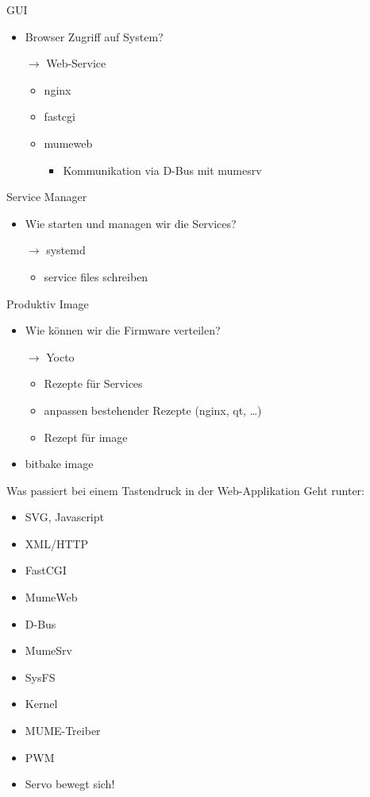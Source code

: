 \begin{frame}{GUI}
	\begin{itemize}
		\item Browser Zugriff auf System?
		\item[$\rightarrow$] Web-Service
		\begin{itemize}
			\item nginx
			\item fastcgi
			\item mumeweb
			\begin{itemize}
				\item Kommunikation via D-Bus mit mumesrv
			\end{itemize}
		\end{itemize}
	\end{itemize}
\end{frame}

\begin{frame}{Service Manager}
	\begin{itemize}
		\item Wie starten und managen wir die Services?
		\item[$\rightarrow$] systemd
		\begin{itemize}
			\item service files schreiben
		\end{itemize}
	\end{itemize}
\end{frame}

\begin{frame}{Produktiv Image}
	\begin{itemize}
		\item Wie können wir die Firmware verteilen?
		\item[$\rightarrow$] Yocto
		\begin{itemize}
			\item Rezepte für Services
			\item anpassen bestehender Rezepte (nginx, qt, \ldots)
			\item Rezept für image
		\end{itemize}
		\item bitbake image
	\end{itemize}
\end{frame}

\begin{frame}{Was passiert bei einem Tastendruck in der Web-Applikation}
	Geht runter:
	\begin{itemize}
		\item SVG, Javascript
		\item XML/HTTP
		\item FastCGI
		\item MumeWeb
		\item D-Bus
		\item MumeSrv
		\item SysFS
		\item Kernel
		\item MUME-Treiber
		\item PWM
		\item Servo bewegt sich!
	\end{itemize}
\end{frame}

